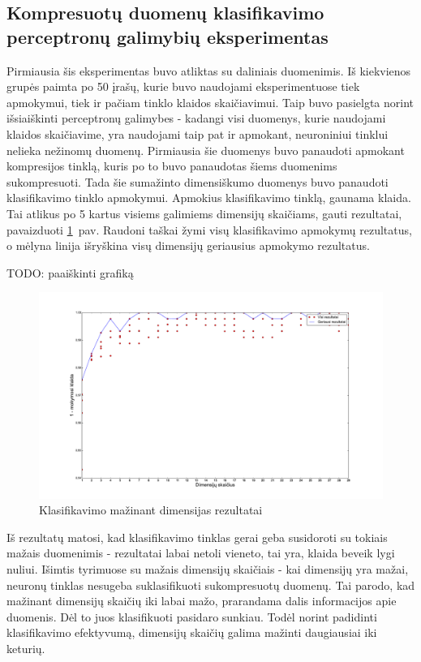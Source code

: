 \documentclass{VUMIFPSbakalaurinis}
\newcommand{\TODO}[1]{
\colorbox{todo-background-color}{TODO: #1}
}
\begin{document}
\subsection{Kompresuotų duomenų klasifikavimo perceptronų galimybių eksperimentas}

Pirmiausia šis eksperimentas buvo atliktas su daliniais duomenimis.
Iš kiekvienos grupės paimta po 50 įrašų, kurie buvo naudojami eksperimentuose tiek apmokymui, tiek ir pačiam tinklo klaidos skaičiavimui.
Taip buvo pasielgta norint išsiaiškinti perceptronų galimybes - kadangi visi duomenys, kurie naudojami klaidos skaičiavime, yra naudojami taip pat ir apmokant, neuroniniui tinklui nelieka nežinomų duomenų.
Pirmiausia šie duomenys buvo panaudoti apmokant kompresijos tinklą, kuris po to buvo panaudotas šiems duomenims sukompresuoti.
Tada šie sumažinto dimensiškumo duomenys buvo panaudoti klasifikavimo tinklo apmokymui.
Apmokius klasifikavimo tinklą, gaunama klaida.
Tai atlikus po 5 kartus visiems galimiems dimensijų skaičiams, gauti rezultatai, pavaizduoti \ref{fig:experiment-1}~pav.
Raudoni taškai žymi visų klasifikavimo apmokymų rezultatus, o mėlyna linija išryškina visų dimensijų geriausius apmokymo rezultatus.

\TODO{paaiškinti grafiką}

\begin{figure}
	\includegraphics[scale=0.32]{pics/dimensions_2015-5-23_15-50-6}
	\caption{Klasifikavimo mažinant dimensijas rezultatai}
	\label{fig:experiment-1}
\end{figure}

Iš rezultatų matosi, kad klasifikavimo tinklas gerai geba susidoroti su tokiais mažais duomenimis - rezultatai labai netoli vieneto, tai yra, klaida beveik lygi nuliui.
Išimtis tyrimuose su mažais dimensijų skaičiais - kai dimensijų yra mažai, neuronų tinklas nesugeba suklasifikuoti sukompresuotų duomenų.
Tai parodo, kad mažinant dimensijų skaičių iki labai mažo, prarandama dalis informacijos apie duomenis.
Dėl to juos klasifikuoti pasidaro sunkiau.
Todėl norint padidinti klasifikavimo efektyvumą, dimensijų skaičių galima mažinti daugiausiai iki keturių.
\end{document}
